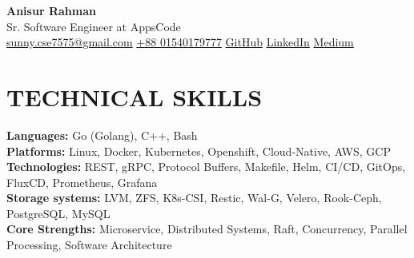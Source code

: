 \documentclass[letterpaper,11pt]{article}
\begin{document}
\begin{flushleft}
    {\Huge \textbf{Anisur Rahman}} \\[4pt]
    {\large Sr. Software Engineer at AppsCode} \\[6pt]

    \faEnvelope \;
    \href{mailto:sunny.cse7575@gmail.com}{sunny.cse7575@gmail.com}
    \quad
    \faPhone \;
    \href{tel:+8801540179777}{+88 01540179777}
    \quad
    \faGithub \;
    \href{https://github.com/anisurrahman75}{GitHub}
    \quad
    \faLinkedin \;
    \href{https://linkedin.com/in/anisur-rahman75/}{LinkedIn}
    \quad
    \faMedium \;
    \href{https://medium.com}{Medium}
\end{flushleft}

\section{\color{airforceblue}TECHNICAL SKILLS}
 \begin{itemize}[leftmargin=0in, label={}]
    \small{\item{
     \textbf{\normalsize{Languages:}}{ \normalsize{Go (Golang), C++, Bash}} \\
      \vspace{2pt}
      \textbf{\normalsize{Platforms:}}{ \normalsize{Linux, Docker, Kubernetes, Openshift, Cloud-Native, AWS, GCP}} \\
     \vspace{2pt}
     \textbf{\normalsize{Technologies:}}{ \normalsize{REST, gRPC, Protocol Buffers, Makefile, Helm, CI/CD, GitOps, FluxCD, Prometheus, Grafana}} \\
    \vspace{2pt}
     \textbf{\normalsize{Storage systems:}}{ \normalsize{LVM, ZFS, K8s-CSI, Restic, Wal-G, Velero, Rook-Ceph, PostgreSQL, MySQL}} \\
     \vspace{2pt}
     \textbf{\normalsize{Core Strengths:}}{ \normalsize{Microservice, Distributed Systems, Raft, Concurrency, Parallel Processing, Software Architecture}}
     }}
 \end{itemize}
 
 \vspace{-16pt}
 
\end{document}
